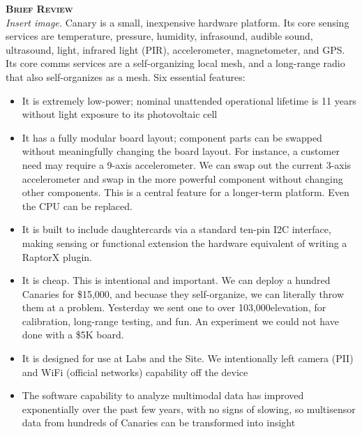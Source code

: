 \documentclass[11pt]{letter} %
\begin{document}
\textsc{\textbf {Brief Review}}\\
\textit{Insert image.} Canary is a small, inexpensive hardware platform. Its core sensing services are temperature, pressure, humidity, infrasound, audible sound, ultrasound, light, infrared light (PIR), accelerometer, magnetometer, and GPS. Its core comms services are a self-organizing local mesh, and a long-range radio that also self-organizes as a mesh. Six essential features:
\renewcommand\labelitemi{\tiny$\bullet$}
\begin{itemize}
\item It is extremely low-power; nominal unattended operational lifetime is 11 years without light exposure to its photovoltaic cell
\item It has a fully modular board layout; component parts can be swapped without meaningfully changing the board layout. For instance, a customer need may require a 9-axis accelerometer. We can swap out the current 3-axis accelerometer and swap in the more powerful component without changing other components. This is a central feature for a longer-term platform. Even the CPU can be replaced.
\item It is built to include daughtercards via a standard ten-pin I2C interface, making sensing or functional extension the hardware equivalent of writing a RaptorX plugin.
\item It is cheap. This is intentional and important. We can deploy a hundred Canaries for \$15,000, and becuase they self-organize, we can literally throw them at a problem. Yesterday we sent one to over 103,000\textquotesingle  elevation, for calibration, long-range testing, and fun. An experiment we could not have done with a \$5K board.
\item It is designed for use at Labs and the Site. We intentionally left camera (PII) and WiFi (official networks) capability off the device
\item The software capability to analyze multimodal data has improved exponentially over the past few years, with no signs of slowing, so multisensor data from hundreds of Canaries can be transformed into insight
\end{itemize} 

\vspace{20 pt}
\end{document}
